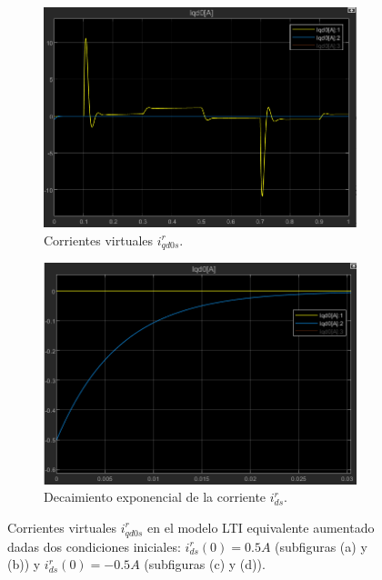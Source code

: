 \documentclass{article}
\begin{document}
\begin{figure}[H]
    \vspace{0.5cm} %

    \begin{subfigure}[b]{0.42\textwidth}
        \centering
        \includegraphics[width=\textwidth]{Imagenes/CorrientesVirtuales-0,5ALTIaumentado.png}
        \caption{Corrientes virtuales \(i^r_{qd0s}\).}
        \label{fig:CorrientesVirtualesId-0.5ALTIaumentado}
    \end{subfigure}
    \hfill
    \begin{subfigure}[b]{0.4\textwidth}
        \centering
        \includegraphics[width=\textwidth]{Imagenes/DecaimientoCorrienteId-0,5ALTIaumentado.png}
        \caption{Decaimiento exponencial de la corriente \(i^r_{ds}\).}
        \label{fig:DecaimientoCorrienteId-0.5ALTIaumentado}
    \end{subfigure}

    \caption{Corrientes virtuales \(i^r_{qd0s}\) en el modelo LTI equivalente aumentado dadas dos condiciones iniciales: \(i^r_{ds}(0) = 0.5A\) (subfiguras (a) y (b)) y \(i^r_{ds}(0) = -0.5A\) (subfiguras (c) y (d)).}
    \label{fig:CorrientesVirtualesCondicionIdLTIAumentado}
\end{figure}
\end{document}
